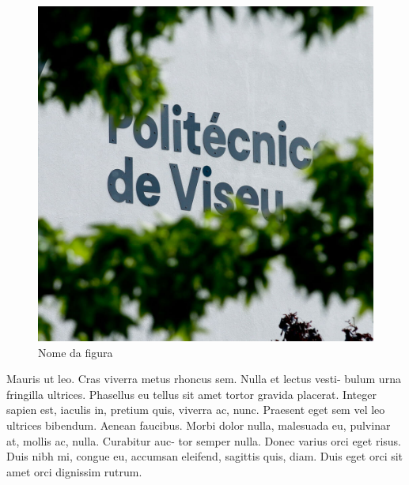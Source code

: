 \begin{figure}[!htbp]
    \centering
    \includegraphics[scale=0.2, angle=0]{Figuras/ftimg_1318-circulo.jpg}
    \caption{Nome da figura}
    \label{fig:circulo}
\end{figure}
Mauris ut leo. Cras viverra metus rhoncus sem. Nulla et lectus vesti- bulum urna fringilla ultrices. Phasellus eu tellus sit amet tortor gravida placerat. Integer sapien est, iaculis in, pretium quis, viverra ac, nunc. Praesent eget sem vel leo ultrices bibendum. Aenean faucibus. Morbi dolor nulla, malesuada eu, pulvinar at, mollis ac, nulla. Curabitur auc- tor semper nulla. Donec varius orci eget risus. Duis nibh mi, congue eu, accumsan eleifend, sagittis quis, diam. Duis eget orci sit amet orci dignissim rutrum.